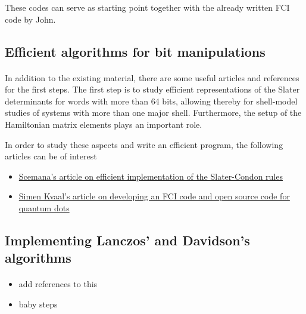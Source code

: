 \documentclass[%
oneside,                 %
final,                   %
10pt]{article}
\begin{document}
\noindent
These codes can serve as starting point together with the already written FCI code by John.



\subsection*{Efficient algorithms for bit manipulations}

\paragraph{}
In addition to the existing material, there are some useful articles and references for the first steps. 
The first step is to study efficient representations of the Slater determinants for words with more than 64 bits, allowing thereby for shell-model studies 
of systems with more than one major shell. Furthermore, the setup of the Hamiltonian matrix elements plays an important role. 

In order to study these aspects and write an efficient program, the following articles can be of interest
\begin{itemize}
\item \href{{http://arxiv.org/abs/1311.6244}}{Scemana's article on efficient implementation of the Slater-Condon rules}

\item \href{{http://arxiv.org/abs/0810.2644}}{Simen Kvaal's article on developing an FCI code and open source code for quantum dots}
\end{itemize}

\noindent





\subsection*{Implementing Lanczos' and Davidson's algorithms}

\paragraph{}
\begin{itemize}
\item add references to this

\item baby steps
\end{itemize}
\end{document}
